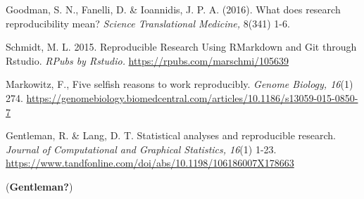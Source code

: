 \documentclass[
  12pt,
]{article}
\begin{document}
Goodman, S. N., Fanelli, D. \& Ioannidis, J. P. A. (2016). What does
research reproducibility mean? \emph{Science Translational Medicine,}
8(341) 1-6.

Schmidt, M. L. 2015. Reproducible Research Using RMarkdown and Git
through Rstudio. \emph{RPubs by Rstudio.}
\url{https://rpubs.com/marschmi/105639}

Markowitz, F., Five selfish reasons to work reproducibly. \emph{Genome
Biology, 16}(1) 274.
\url{https://genomebiology.biomedcentral.com/articles/10.1186/s13059-015-0850-7}

Gentleman, R. \& Lang, D. T. Statistical analyses and reproducible
research. \emph{Journal of Computational and Graphical Statistics,
16}(1) 1-23.
\url{https://www.tandfonline.com/doi/abs/10.1198/106186007X178663}

(\textbf{Gentleman?})
\end{document}
